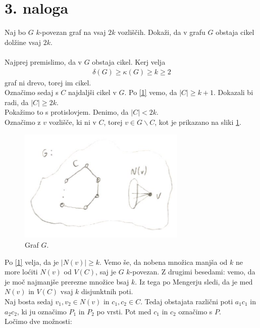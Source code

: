 \documentclass[a4paper,11pt]{article}
\begin{document}
\section*{3. naloga}
Naj bo $G$ $k$-povezan graf na vsaj $2k$ vozliščih. Dokaži, da v grafu $G$ obstaja cikel dolžine vsaj $2k$.
\\
\\
Najprej premislimo, da v $G$ obstaja cikel.
Kerj velja
\begin{align}\label{1}
    \delta (G) \geq \kappa (G) \geq k \geq 2
\end{align}
graf ni drevo, torej im cikel.
\\
Označimo sedaj s $C$ najdaljši cikel v $G$. Po \ref{1} vemo, da $|C| \geq k + 1$. Dokazali bi radi, da $|C| \geq 2k$. 
\\
Pokažimo to s protislovjem. Denimo, da $|C| < 2k$. 
\\
Označimo z $v$ vozlišče, ki ni v $C$, torej $v \in G \backslash C$, kot je prikazano na sliki \ref{graf}.
\begin{figure}[ht!]
    \centering
    \includegraphics[width=80mm]{Slike/3_graf.png}
    \caption{Graf $G$.}\label{graf}
\end{figure}
Po \ref{1} velja, da je $|N(v)| \geq k$. Vemo še, da nobena množica manjša od $k$ ne more loćiti $N(v)$ od $V(C)$, saj je $G$ $k$-povezan.
Z drugimi besedami: vemo, da je moč najmanjše prerezne množice bsaj $k$. Iz tega po Mengerju sledi, da je med $N(v)$ in $V(C)$ vsaj $k$ disjunktnih poti.
\\
Naj bosta sedaj $v_1, v_2 \in N(v)$ in $c_1, c_2 \in C$. Tedaj obstajata različni poti $a_1c_1$ in $a_2c_2$, ki ju označimo $P_1$ in $P_2$ po vrsti. Pot med $c_1$ in $c_2$ označimo s $P$.
\\
Ločimo dve možnosti:
\end{document}
